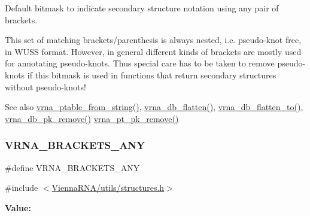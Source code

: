 Default bitmask to indicate secondary structure notation using any pair of brackets. 

This set of matching brackets/parenthesis is always nested, i.\+e. pseudo-\/knot free, in W\+U\+SS format. However, in general different kinds of brackets are mostly used for annotating pseudo-\/knots. Thus special care has to be taken to remove pseudo-\/knots if this bitmask is used in functions that return secondary structures without pseudo-\/knots!

\begin{DoxySeeAlso}{See also}
\mbox{\hyperlink{group__struct__utils__pair__table_gac76c9ef3de507748fb0416a59323362b}{vrna\+\_\+ptable\+\_\+from\+\_\+string()}}, \mbox{\hyperlink{group__struct__utils__dot__bracket_gafd1304f5a86e2e3f1425e725cde44fa2}{vrna\+\_\+db\+\_\+flatten()}}, \mbox{\hyperlink{group__struct__utils__dot__bracket_ga690425199c8b71545e7196e3af1436f8}{vrna\+\_\+db\+\_\+flatten\+\_\+to()}}, \mbox{\hyperlink{group__struct__utils__dot__bracket_ga97dbebaa3fc49524cf5afa338a6c52ee}{vrna\+\_\+db\+\_\+pk\+\_\+remove()}} \mbox{\hyperlink{group__struct__utils__pair__table_gae8f31c859b48f97b8af889e914e4d040}{vrna\+\_\+pt\+\_\+pk\+\_\+remove()}} 
\end{DoxySeeAlso}
\mbox{\label{group__struct__utils__dot__bracket_ga013a9da903462d2f2b037f0c6ffb46e4}} 
\subsubsection{\texorpdfstring{VRNA\_BRACKETS\_ANY}{VRNA\_BRACKETS\_ANY}}
{\footnotesize\ttfamily \#define V\+R\+N\+A\+\_\+\+B\+R\+A\+C\+K\+E\+T\+S\+\_\+\+A\+NY}



{\ttfamily \#include $<$\mbox{\hyperlink{utils_2structures_8h}{Vienna\+R\+N\+A/utils/structures.\+h}}$>$}

{\bfseries Value\+:}
\begin{DoxyCode}{0}

\end{DoxyCode}


